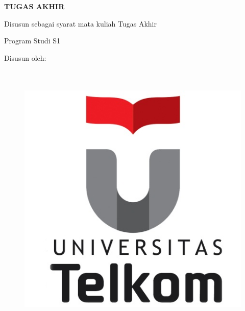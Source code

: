 
\begin{titlepage}
    \begin{center}      
        \bo{\Judul} \\[0.75cm]
        
        \vspace*{1 cm}
        \textit{\bo{\JudulInggris}} \\[2.0cm]

        \vspace*{0.05 cm}    
        \textbf{TUGAS AKHIR}
        
        \vspace*{1 cm}
        
Disusun sebagai syarat mata kuliah Tugas Akhir

Program Studi S1 \program

        \vspace*{1 cm}       
        Disusun oleh:\\
        \bo{\Penulis} \\
        \bo{\nim} \\

        \vspace*{1.0cm}
        
        \begin{figure}
            \begin{center}
                \includegraphics[scale=1]{pics/pengantar/Untel.jpg}
            \end{center}
        \end{figure}
        \vspace*{1.0cm}
    \end{center}
\end{titlepage}
